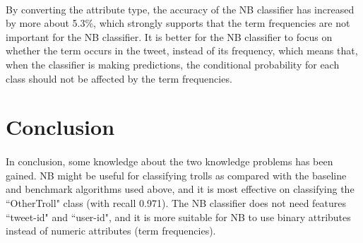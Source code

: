 \documentclass[11pt]{article}
\begin{document}
\paragraph{} By converting the attribute type, the accuracy of the NB classifier has increased by more about 5.3\%, which strongly supports that the term frequencies are not important for the NB classifier. It is better for the NB classifier to focus on whether the term occurs in the tweet, instead of its frequency, which means that, when the classifier is making predictions, the conditional probability for each class should not be affected by the term frequencies.

\section{Conclusion}
\paragraph{} In conclusion, some knowledge about the two knowledge problems has been gained. NB might be useful for classifying trolls as compared with the baseline and benchmark algorithms used above, and it is most effective on classifying the ``OtherTroll" class (with recall 0.971). The NB classifier does not need features ``tweet-id" and ``user-id", and it is more suitable for NB to use binary attributes instead of numeric attributes (term frequencies).

\printbibliography
\end{document}
